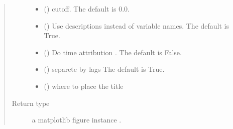 \documentclass[letterpaper,10pt,english]{sphinxmanual}
\begin{document}
\begin{fulllineitems}
\begin{fulllineitems}
\begin{quote}
\begin{description}
\begin{itemize}
\item {} 
\sphinxAtStartPar
{} (\sphinxstyleliteralemphasis{\sphinxupquote{, }}) \textendash{} cutoff. The default is 0.0.

\item {} 
\sphinxAtStartPar
{} (\sphinxstyleliteralemphasis{\sphinxupquote{, }}) \textendash{} Use descriptions instead of variable names. The default is True.

\item {} 
\sphinxAtStartPar
{} (\sphinxstyleliteralemphasis{\sphinxupquote{, }}) \textendash{} Do time attribution . The default is False.

\item {} 
\sphinxAtStartPar
{} (\sphinxstyleliteralemphasis{\sphinxupquote{, }}) \textendash{} separete by lags The default is True.

\item {} 
\sphinxAtStartPar
{} (\sphinxstyleliteralemphasis{\sphinxupquote{, }}) \textendash{} where to place the title

\end{itemize}

\item[{Return type}] \leavevmode
\sphinxAtStartPar
a matplotlib figure instance .

\end{description}\end{quote}

\end{fulllineitems}



\end{fulllineitems}
\end{document}

